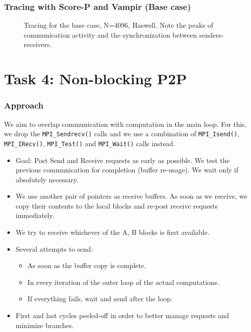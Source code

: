 \documentclass[10pt, compress]{beamer}
\begin{document}
\begin{frame}
  \frametitle{Tracing with Score-P and Vampir (Base case)}
    \begin{figure}
  \centering
  \caption{Tracing for the base case, N=4096, Haswell. Note the peaks of communication activity and the synchronization between senders-receivers.}
  \label{fig:vampir_provided}
  \end{figure}
\end{frame}


\section{Task 4: Non-blocking P2P}
\begin{frame}
  \frametitle{Approach}
  We aim to overlap communication with computation in the main loop. For this, we drop the \texttt{MPI\_Sendrecv()} calls and we use a combination of \texttt{MPI\_Isend()}, \texttt{MPI\_IRecv()}, \texttt{MPI\_Test()} and \texttt{MPI\_Wait()} calls instead.
  
  \begin{itemize}
  \item Goal: Post Send and Receive requests as early as possible. We test the previous communication for completion (buffer re-usage). We wait only if absolutely necessary.
  \item We use another pair of pointers as receive buffers. As soon as we receive, we copy their contents to the local blocks and re-post receive requests immediately.
  \item We try to receive whichever of the A, B blocks is first available.
  \item Several attempts to send:
  \begin{itemize}
  \item As soon as the buffer copy is complete.
  \item In every iteration of the outer loop of the actual computations.
  \item If everything fails, wait and send after the loop.
  \end{itemize}
  \item First and last cycles peeled-off in order to better manage requests and minimize branches.
  \end{itemize}

\end{frame}
\end{document}
